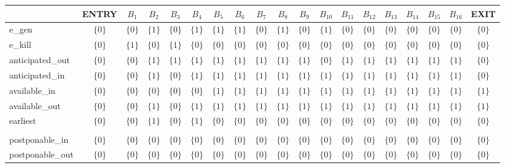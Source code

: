 \begin{table}[ht]
\centering
\begin{tabular}{l|c|c|c|c|c|c|c|c|c|c|c|c|c|c|c|c|c|c}
	& ENTRY & $B_{1}$ & $B_{2}$ & $B_{3}$ & $B_{4}$ & $B_{5}$ & $B_{6}$ & $B_{7}$ & $B_{8}$ & $B_{9}$ & $B_{10}$ & $B_{11}$ & $B_{12}$ & $B_{13}$ & $B_{14}$ & $B_{15}$ & $B_{16}$ & EXIT \\
\hline
e\_gen & $\{0\}$ & $\{0\}$ & $\{1\}$ & $\{0\}$ & $\{1\}$ & $\{1\}$ & $\{1\}$ & $\{0\}$ & $\{1\}$ & $\{0\}$ & $\{1\}$ & $\{0\}$ & $\{0\}$ & $\{0\}$ & $\{0\}$ & $\{0\}$ & $\{0\}$ & $\{0\}$ \\
e\_kill & $\{0\}$ & $\{1\}$ & $\{0\}$ & $\{1\}$ & $\{0\}$ & $\{0\}$ & $\{0\}$ & $\{0\}$ & $\{0\}$ & $\{0\}$ & $\{0\}$ & $\{0\}$ & $\{0\}$ & $\{0\}$ & $\{0\}$ & $\{0\}$ & $\{0\}$ & $\{0\}$ \\
anticipated\_out & $\{0\}$ & $\{0\}$ & $\{1\}$ & $\{1\}$ & $\{1\}$ & $\{1\}$ & $\{1\}$ & $\{1\}$ & $\{1\}$ & $\{1\}$ & $\{0\}$ & $\{1\}$ & $\{1\}$ & $\{1\}$ & $\{1\}$ & $\{1\}$ & $\{1\}$ & $\{0\}$ \\
anticipated\_in & $\{0\}$ & $\{0\}$ & $\{1\}$ & $\{0\}$ & $\{1\}$ & $\{1\}$ & $\{1\}$ & $\{1\}$ & $\{1\}$ & $\{1\}$ & $\{1\}$ & $\{1\}$ & $\{1\}$ & $\{1\}$ & $\{1\}$ & $\{1\}$ & $\{1\}$ & $\{0\}$ \\
available\_in & $\{0\}$ & $\{0\}$ & $\{0\}$ & $\{0\}$ & $\{0\}$ & $\{1\}$ & $\{1\}$ & $\{1\}$ & $\{1\}$ & $\{1\}$ & $\{1\}$ & $\{1\}$ & $\{1\}$ & $\{1\}$ & $\{1\}$ & $\{1\}$ & $\{1\}$ & $\{1\}$ \\
available\_out & $\{0\}$ & $\{0\}$ & $\{1\}$ & $\{0\}$ & $\{1\}$ & $\{1\}$ & $\{1\}$ & $\{1\}$ & $\{1\}$ & $\{1\}$ & $\{1\}$ & $\{1\}$ & $\{1\}$ & $\{1\}$ & $\{1\}$ & $\{1\}$ & $\{1\}$ & $\{1\}$ \\
earliest & $\{0\}$ & $\{0\}$ & $\{1\}$ & $\{0\}$ & $\{1\}$ & $\{0\}$ & $\{0\}$ & $\{0\}$ & $\{0\}$ & $\{0\}$ & $\{0\}$ & $\{0\}$ & $\{0\}$ & $\{0\}$ & $\{0\}$ & $\{0\}$ & $\{0\}$ & $\{0\}$ \\
 &  &  &  &  &  &  &  &  &  &  &  &  &  &  &  &  &  &  \\
postponable\_in & $\{0\}$ & $\{0\}$ & $\{0\}$ & $\{0\}$ & $\{0\}$ & $\{0\}$ & $\{0\}$ & $\{0\}$ & $\{0\}$ & $\{0\}$ & $\{0\}$ & $\{0\}$ & $\{0\}$ & $\{0\}$ & $\{0\}$ & $\{0\}$ & $\{0\}$ & $\{0\}$ \\
postponable\_out & $\{0\}$ & $\{0\}$ & $\{0\}$ & $\{0\}$ & $\{0\}$ & $\{0\}$ & $\{0\}$ & $\{0\}$ & $\{0\}$ & $\{0\}$ & $\{0\}$ & $\{0\}$ & $\{0\}$ & $\{0\}$ & $\{0\}$ & $\{0\}$ & $\{0\}$ & $\{0\}$ \\

\end{tabular}
\end{table}
